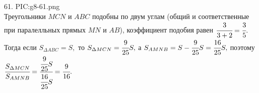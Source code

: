 61. {{PIC:g8-61.png}}\\
Треугольники $MCN$ и $ABC$ подобны по двум углам (общий и соответственные при паралелльных прямых $MN$ и $AB$), коэффициент подобия равен $\cfrac{3}{3+2}=\cfrac{3}{5}.$ Тогда если $S_{\Delta ABC}=S,$ то $S_{\Delta MCN}=\cfrac{9}{25}S,$ а $S_{AMNB}=S-\cfrac{9}{25}S=\cfrac{16}{25}S,$ поэтому $\cfrac{S_{\Delta MCN}}{S_{AMNB}}=\cfrac{\cfrac{9}{25}S}{\cfrac{16}{25}S}=\cfrac{9}{16}.$\\
